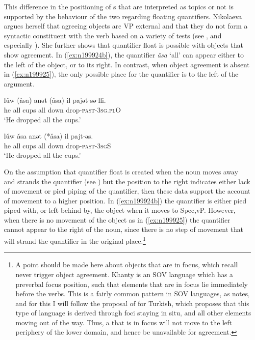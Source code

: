 \documentclass[output=paper
,modfonts
,nonflat]{langsci/langscibook}
\begin{document}
\noindent This difference in the positioning of \theme s that are interpreted as topics or not is supported by the behaviour of the two regarding floating quantifiers. Nikolaeva argues herself that agreeing objects are VP external and that they do not form a syntactic constituent with the verb based on a variety of tests (see \citealt{nikolaeva1999}, and especially \citealt[][67--69]{ostyakgrammar}). She further shows that quantifier float is possible with objects that show agreement. 
In (\ref{ex:n199924b}), the quantifier \textit{\v{a}sa} `all' can appear either to the left of the object, or to its right. In contrast, when object agreement is absent in (\ref{ex:n199925}), the only possible place for the quantifier is to the left of the argument.\largerpage
\begin{exe}
\ex \citet[][345]{nikolaeva1999}
\begin{xlist}
\ex 
{\gll l\v{u}w (\v{a}sa) anət (\v{a}sa) il pajət-sə-lli.\\
he all cups all down drop-\textsc{past-3sg.plO}\\
\glt `He dropped all the cups.'} \label{ex:n199924b}

\ex 
{\gll l\v{u}w \v{a}sa anət (*\v{a}sa) il pajt-əs.\\
he all cups all down drop-\textsc{past-3sgS}\\
\glt `He dropped all the cups.'} \label{ex:n199925}
\end{xlist}
\end{exe}

\noindent On the assumption that quantifier float is created when the noun moves away and strands the quantifier (see \citealt{sportiche1988,mccloskey2000,boskovic2004b}) but the position to the right indicates either lack of movement or pied piping of the quantifier, then these data support the account of movement to a higher position. 
In (\ref{ex:n199924b}) the quantifier is either pied piped with, or left behind by, the object when it moves to Spec,vP. However, when there is no movement of the object as in (\ref{ex:n199925}) the quantifier cannot appear to the right of the noun, since there is no step of movement that will strand the quantifier in the original place.\footnote{A point should be made here about \theme{} objects that are in focus, which recall never trigger object agreement.  Khanty is an SOV language which has a preverbal focus position, such that elements that are in focus lie immediately before the verbs. 
This is a fairly common pattern in SOV languages, as \citet{nikolaeva1999} notes, and for this I will follow the proposal of \citet{sener2010} for Turkish, which \citeauthor{sener2010} proposes that this type of language is derived through foci staying in situ, and all other elements moving out of the way.
Thus, a \theme{} that is in focus will not move to the left periphery of the lower domain, and hence be unavailable for agreement.}
\end{document}
